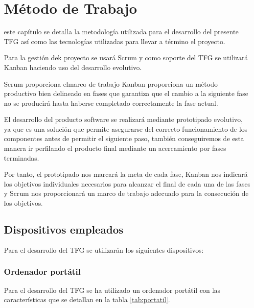 \chapter{Método de Trabajo}
\label{chap:metodo}

 este capítulo se detalla la metodología utilizada para el desarrollo del presente \ac{TFG} así como las tecnologías utilizadas para llevar a término el proyecto.

Para la gestión dek proyecto se usará Scrum y como soporte del \ac{TFG} se utilizará Kanban haciendo uso del desarrollo evolutivo.

Scrum proporciona elmarco de trabajo Kanban proporciona un método productivo bien delineado en fases que garantiza que el cambio a la siguiente fase no se producirá hasta haberse completado correctamente la fase actual.

El desarrollo del producto software se realizará mediante prototipado evolutivo, ya que es una solución que permite asegurarse del correcto funcionamiento de los componentes antes de permitir el siguiente paso, también conseguiremos de esta manera ir perfilando el producto final mediante un acercamiento por fases terminadas.

Por tanto, el prototipado nos marcará la meta de cada fase, Kanban nos indicará los objetivos individuales necesarios para alcanzar el final de cada una de las fases y Scrum nos proporcionará un marco de trabajo adecuado para la consecución de los objetivos.


\section{Dispositivos empleados}
\label{section:dispositivos-empleados}
Para el desarrollo del \ac{TFG} se utilizarán los siguientes dispositivos:

	\subsection{Ordenador portátil}
	
	Para el desarrollo del TFG se ha utilizado un ordenador portátil con las características que se detallan en la tabla \ref{tab:portatil}.
	
